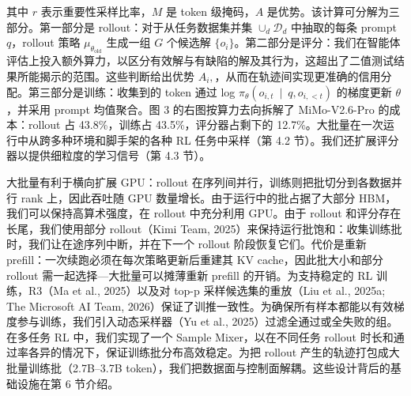 其中 $r$ 表示重要性采样比率，$M$ 是 token 级掩码，$A$ 是优势。该计算可分解为三部分。第一部分是 rollout：对于从任务数据集并集 \(\cup _ { d } \mathcal { D } _ { d }\) 中抽取的每条 prompt $q$，rollout 策略 \(\mu _ { \theta _ { \mathrm { o l d } } }\) 生成一组 $G$ 个候选解 $\{o_i\}$。第二部分是评分：我们在智能体评估上投入额外算力，以区分有效解与有缺陷的解及其行为，这超出了二值测试结果所能揭示的范围。这些判断给出优势 \(A _ { i } ,\)，从而在轨迹间实现更准确的信用分配。第三部分是训练：收集到的 token 通过 log \(\pi _ { \theta } ( o _ { i , t } ~ \mid ~ q , o _ { i , < t } )\) 的梯度更新 $\theta$，并采用 prompt 均值聚合。图 3 的右图按算力去向拆解了 MiMo-V2.6-Pro 的成本：rollout 占 43.8\%，训练占 43.5\%，评分器占剩下的 12.7\%。大批量在一次运行中从跨多种环境和脚手架的各种 RL 任务中采样（第 4.2 节）。我们还扩展评分器以提供细粒度的学习信号（第 4.3 节）。



大批量有利于横向扩展 GPU：rollout 在序列间并行，训练则把批切分到各数据并行 rank 上，因此吞吐随 GPU 数量增长。由于运行中的批占据了大部分 HBM，我们可以保持高算术强度，在 rollout 中充分利用 GPU。由于 rollout 和评分存在长尾，我们使用部分 rollout（Kimi Team, 2025）来保持运行批饱和：收集训练批时，我们让在途序列中断，并在下一个 rollout 阶段恢复它们。代价是重新 prefill：一次续跑必须在每次策略更新后重建其 KV cache，因此批大小和部分 rollout 需一起选择---大批量可以摊薄重新 prefill 的开销。为支持稳定的 RL 训练，R3（Ma et al., 2025）以及对 top-p 采样候选集的重放（Liu et al., 2025a; The Microsoft AI Team, 2026）保证了训推一致性。为确保所有样本都能以有效梯度参与训练，我们引入动态采样器（Yu et al., 2025）过滤全通过或全失败的组。在多任务 RL 中，我们实现了一个 Sample Mixer，以在不同任务 rollout 时长和通过率各异的情况下，保证训练批分布高效稳定。为把 rollout 产生的轨迹打包成大批量训练批（2.7B--3.7B token），我们把数据面与控制面解耦。这些设计背后的基础设施在第 6 节介绍。
